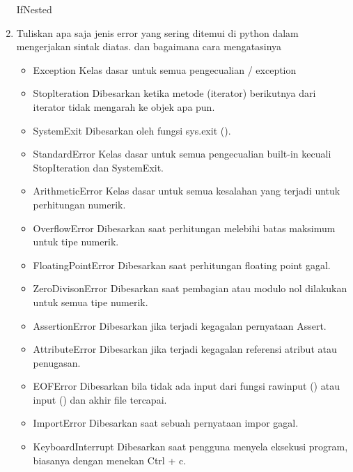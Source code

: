 \begin{enumerate}
    IfNested
    

    \item Tuliskan apa saja jenis error yang sering ditemui di python dalam mengerjakan
    sintak diatas. dan bagaimana cara mengatasinya
    \begin{itemize}
        \item Exception
        Kelas dasar untuk semua pengecualian / exception

        \item Stoplteration
        Dibesarkan ketika metode (iterator) berikutnya dari iterator tidak mengarah ke objek apa pun.

        \item SystemExit
        Dibesarkan oleh fungsi sys.exit ().

        \item StandardError
        Kelas dasar untuk semua pengecualian built-in kecuali StopIteration dan SystemExit.

        \item ArithmeticError
        Kelas dasar untuk semua kesalahan yang terjadi untuk perhitungan numerik.

        \item OverflowError
        Dibesarkan saat perhitungan melebihi batas maksimum untuk tipe numerik.

        \item FloatingPointError
        Dibesarkan saat perhitungan floating point gagal.

        \item ZeroDivisonError
        Dibesarkan saat pembagian atau modulo nol dilakukan untuk semua tipe numerik.

        \item AssertionError
        Dibesarkan jika terjadi kegagalan pernyataan Assert.

        \item AttributeError
        Dibesarkan jika terjadi kegagalan referensi atribut atau penugasan.
         
        \item EOFError
        Dibesarkan bila tidak ada input dari fungsi rawinput () atau input () dan akhir file tercapai.

        \item ImportError
        Dibesarkan saat sebuah pernyataan impor gagal.

        \item KeyboardInterrupt
        Dibesarkan saat pengguna menyela eksekusi program, biasanya dengan menekan Ctrl + c.


\end{itemize}
\end{enumerate}
